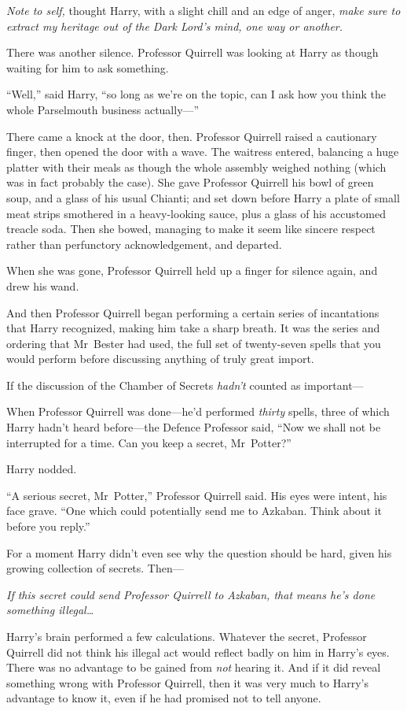 \emph{Note to self,} thought Harry, with a slight chill and an edge of anger, \emph{make sure to extract my heritage out of the Dark Lord’s mind, one way or another.}

There was another silence. Professor Quirrell was looking at Harry as though waiting for him to ask something.

“Well,” said Harry, “so long as we’re on the topic, can I ask how you think the whole Parselmouth business actually—”

There came a knock at the door, then. Professor Quirrell raised a cautionary finger, then opened the door with a wave. The waitress entered, balancing a huge platter with their meals as though the whole assembly weighed nothing (which was in fact probably the case). She gave Professor Quirrell his bowl of green soup, and a glass of his usual Chianti; and set down before Harry a plate of small meat strips smothered in a heavy-looking sauce, plus a glass of his accustomed treacle soda. Then she bowed, managing to make it seem like sincere respect rather than perfunctory acknowledgement, and departed.

When she was gone, Professor Quirrell held up a finger for silence again, and drew his wand.

And then Professor Quirrell began performing a certain series of incantations that Harry recognized, making him take a sharp breath. It was the series and ordering that Mr~Bester had used, the full set of twenty-seven spells that you would perform before discussing anything of truly great import.

If the discussion of the Chamber of Secrets \emph{hadn’t} counted as important—

When Professor Quirrell was done—he’d performed \emph{thirty} spells, three of which Harry hadn’t heard before—the Defence Professor said,
“Now we shall not be interrupted for a time. Can you keep a secret, Mr~Potter?”

Harry nodded.

“A serious secret, Mr~Potter,” Professor Quirrell said. His eyes were intent, his face grave.
“One which could potentially send me to Azkaban. Think about it before you reply.”

For a moment Harry didn’t even see why the question should be hard, given his growing collection of secrets. Then—

\emph{If this secret could send Professor Quirrell to Azkaban, that means he’s done something illegal…}

Harry’s brain performed a few calculations. Whatever the secret, Professor Quirrell did not think his illegal act would reflect badly on him in Harry’s eyes. There was no advantage to be gained from \emph{not} hearing it. And if it did reveal something wrong with Professor Quirrell, then it was very much to Harry’s advantage to know it, even if he had promised not to tell anyone.

